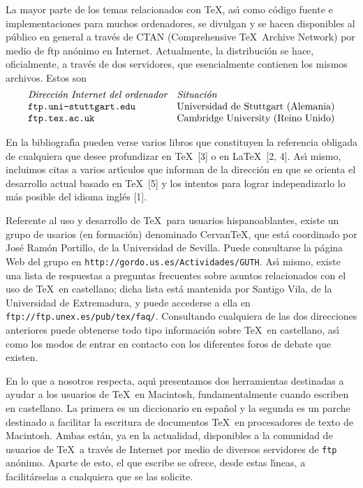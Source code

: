 La mayor parte de los temas relacionados con \TeX, as\'{\i} como c\'odigo
fuente e implementaciones para muchos ordenadores, se divulgan y se hacen
disponibles al p\'ublico en general a trav\'es de CTAN (Comprehensive
\TeX\ Archive Network) por medio de ftp an\'onimo en Internet. Actualmente,
la distribuci\'on se hace, oficialmente, a trav\'es de dos servidores, que
esencialmente contienen los mismos archivos. Estos son
$$
\vbox{
\halign{#\hfil&\quad#\hfil\cr
{\it Direcci\'on Internet del ordenador}&
{\it Situaci\'on}\cr
{\tt ftp.uni-stuttgart.edu}&
Universidad de Stuttgart (Alemania)\cr
{\tt ftp.tex.ac.uk}&
Cambridge University (Reino Unido)\cr
}}
$$

En la bibliograf\'{\i}a pueden verse varios libros que constituyen la
referencia obligada de cualquiera que desee profundizar en \TeX\ [3] o en
\LaTeX\ [2, 4]. As\'{\i} mismo, incluimos citas a varios art\'{\i}culos que
informan de la direcci\'on en que se orienta el desarrollo actual basado en
\TeX\ [5] y los intentos para lograr independizarlo lo m\'as posible del
idioma ingl\'es [1].

Referente al uso y desarrollo de \TeX\ para usuarios hispanoablantes, existe un
grupo de usarios (en formaci\'on) denominado Cervan\TeX, que est\'a
coordinado por Jos\'e Ram\'on Portillo, de la Universidad de Sevilla. Puede
consultarse la p\'agina Web del grupo en
{\tt http://gordo.us.es/Actividades/GUTH}. As\'{\i} mismo, existe una lista de
respuestas a preguntas frecuentes sobre asuntos relacionados con el uso de
\TeX\ en castellano; dicha lista est\'a mantenida por Santigo Vila, de la
Universidad de Extremadura, y puede accederse a ella en {\tt
ftp://ftp.unex.es/pub/tex/faq/}. Consultando cualquiera de las dos
direcciones anteriores puede obtenerse todo tipo informaci\'on sobre \TeX\ en
castellano, as\'{\i} como los modos de entrar en contacto con los diferentes
foros de debate que existen.

En lo que a nosotros respecta, aqu\'{\i} presentamos dos herramientas
destinadas a ayudar a los usuarios de \TeX\ en Macintosh, fundamentalmente
cuando escriben en castellano. La primera es un diccionario en espa\~nol y la
segunda es un parche destinado a facilitar la escritura de documentos
\TeX\ en procesadores de texto de Macintosh. Ambas est\'an, ya en la
actualidad, disponibles a la comunidad de usuarios de \TeX\ a trav\'es de
Internet por medio de diversos servidores de {\tt ftp} an\'onimo. Aparte de
esto, el que escribe se ofrece, desde estas l\'{\i}neas, a facilit\'arselas a
cualquiera que se las solicite.

